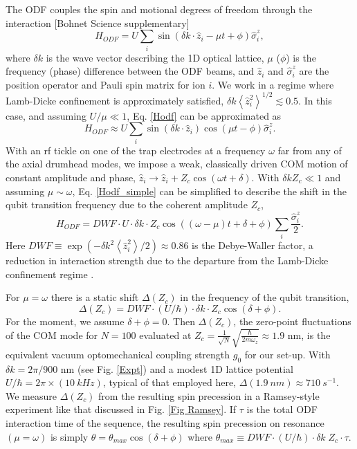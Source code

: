 \documentclass[aps,prl,twocolumn,superscriptaddress,floatfix]{revtex4-1}
\begin{document}
The ODF couples the spin and motional degrees of freedom through the interaction [Bohnet Science supplementary]
\begin{equation}
H_{ODF} = U\sum_{i}\sin(\delta k \cdot \hat{z}_{i} - \mu t + \phi)\hat{\sigma}^{z}_{i} ,
\label{Hodf}
\end{equation}
where $\delta k$ is the wave vector describing the 1D optical lattice, $\mu$ ($\phi$) is the frequency (phase) difference between the ODF beams, and $\hat{z}_{i}$ and $\hat{\sigma}^{z}_{i}$ are the position operator and Pauli spin matrix for ion $i$. We work in a regime where Lamb-Dicke confinement is approximately satisfied, $\delta k \left< \hat{z}^{2}_{i} \right>^{1/2} \lesssim 0.5$. In this case, and assuming $U/\mu \ll 1$, Eq. \ref{Hodf} can be approximated as
\begin{equation}
H_{ODF} \approx  U\sum_{i}\sin(\delta k \cdot \hat{z}_{i})\cos(\mu t - \phi)\hat{\sigma}^{z}_{i}.
\label{Hodf_simple}
\end{equation}
With an rf tickle on one of the trap electrodes at a frequency $\omega$ far from any of the axial drumhead modes, we impose a weak, classically driven COM motion of constant amplitude and phase, $\hat{z}_i \rightarrow \hat{z}_i +Z_c\cos(\omega t+\delta)$.  With $\delta k Z_c \ll 1$ and assuming $\mu\sim\omega$,  Eq. \ref{Hodf_simple} can be simplified to describe the shift in the qubit transition frequency due to the coherent amplitude $Z_c$,
\[H_{ODF} = DWF \cdot U \cdot \delta k \cdot Z_c\cos((\omega - \mu)t + \delta + \phi) \sum_{i} \frac{\hat{\sigma}^{z}_{i}}{2} .\]
Here $DWF \equiv \exp(-\delta k^2 \left< \hat{z}^{2}_{i} \right> / 2) \approx 0.86 $ is the Debye-Waller factor, a reduction in interaction strength due to the departure from the Lamb-Dicke confinement regime \citep{Wineland1998a}.  

For $\mu = \omega$ there is a static shift $\Delta(Z_c)$ in the frequency of the qubit transition, 
\begin{equation}
\Delta(Z_c) = DWF \cdot (U/\hbar) \cdot \delta k \cdot Z_c \cos(\delta + \phi).
\label{frequency shift}
\end{equation}
For the moment, we assume $\delta+\phi=0$.  Then $\Delta(Z_c)$, the zero-point fluctuations of the COM mode for $N=100$ evaluated at $Z_c = \frac{1}{\sqrt{N}}\sqrt{\frac{\hbar}{2m\omega_z}}\approx 1.9$ nm, is the equivalent vacuum optomechanical coupling strength  $g_0$ \citep{Aspelmeyer2014} for our set-up. With  $\delta k =2\pi/900$ nm (see Fig. \ref{Expt}) and a modest 1D lattice potential $U/\hbar = 2\pi \times (10\:kHz)$, typical of that employed here, $\Delta(1.9\:nm) \approx 710\:s^{-1}$.  We measure $\Delta(Z_c)$ from the resulting spin precession in a Ramsey-style experiment like that discussed in Fig. \ref{Fig Ramsey}. If $\tau$ is the total ODF interaction time of the sequence, the resulting spin precession on resonance $(\mu = \omega)$ is simply $\theta = \theta_{max} \cos(\delta+\phi)$ where $\theta_{max} \equiv DWF \cdot (U/\hbar) \cdot \delta k\;Z_c \cdot \tau$.
\end{document}

